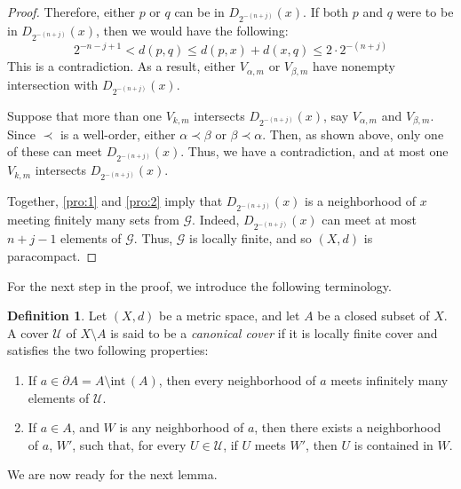 \documentclass[openany, amssymb, psamsfonts]{amsart}
\theoremstyle{definition}
\newtheorem{defn}{Definition}[section]
\numberwithin{equation}{section}
\begin{document}
\begin{proof}
  Therefore, either $p$ or $q$ can be in $D_{2^{-(n+j)}}(x)$. If both $p$ and $q$ were to be in $D_{2^{-(n+j)}}(x)$, then we would have the following:
  \[
    2^{-n-j+1} < d(p,q) \le d(p,x) + d(x,q) \le 2 \cdot 2^{-(n+j)} 
  \]
  This is a contradiction. As a result, either $V_{\alpha,m}$ or $V_{\beta, m}$ have nonempty intersection with $D_{2^{-(n+j)}}(x)$. 

  Suppose that more than one $V_{k,m}$ intersects $D_{2^{-(n+j)}}(x)$, say $V_{\alpha, m}$ and $V_{\beta, m}$. Since $\prec$ is a well-order, either $\alpha \prec \beta$ or $\beta \prec \alpha$. Then, as shown above, only one of these can meet $D_{2^{-(n+j)}}(x)$. Thus, we have a contradiction, and at most one $V_{k,m}$ intersects $D_{2^{-(n+j)}}(x)$.  

  Together, \ref{pro:1} and \ref{pro:2} imply that $D_{2^{-(n+j)}}(x)$ is a neighborhood of $x$ meeting finitely many sets from $\mathcal{G}$. Indeed, $D_{2^{-(n+j)}}(x)$ can meet at most $n+j-1$ elements of $\mathcal{G}$. Thus, $\mathcal{G}$ is locally finite, and so $(X,d)$ is paracompact.
\end{proof}

For the next step in the proof, we introduce the following terminology.

\begin{defn}
  Let $(X,d)$ be a metric space, and let $A$ be a closed subset of $X$. A cover $\mathcal{U}$ of $X\setminus A$ is said to be a \emph{canonical cover} if it is locally finite cover and satisfies the two following properties:
  \begin{enumerate}
    \item \label{pro:3}
    If $a \in \partial A = A \setminus \mathrm{int\, }(A)$, then every neighborhood of $a$ meets infinitely many elements of $\mathcal{U}$. 
    \item \label{pro:4}
    If $a \in A$, and $W$ is any neighborhood of $a$, then there exists a neighborhood of $a$, $W'$, such that, for every $U \in \mathcal{U}$, if $U$ meets $W'$, then $U$ is contained in $W$.
  \end{enumerate}
\end{defn}

We are now ready for the next lemma.
\end{document}
